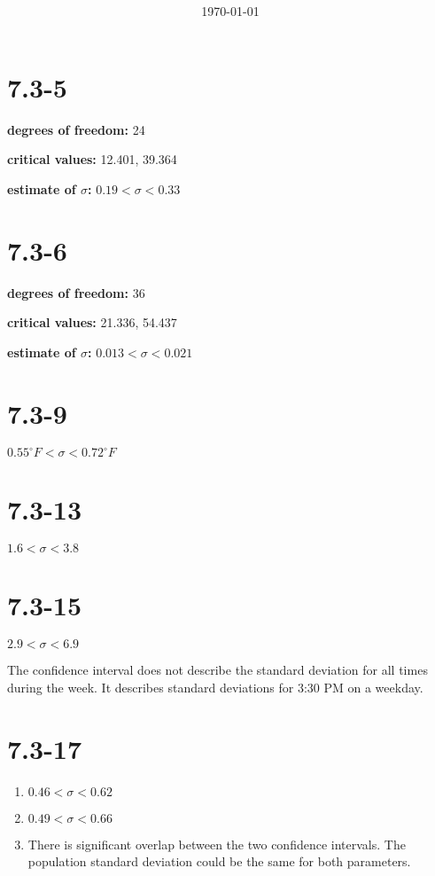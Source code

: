 \documentclass[12pt,fleqn]{article}
\title{\classdescription\ \\ \classname\ \\ $\ $ \\ \assignment}
\author{\authorname}
\date{\today}
\newcommand{\chapter}{7.3}
\newcommand{\problem}[1]{\vspace{5ex}\section*{\chapter-#1}}
\begin{document}
\maketitle


\problem{5}
\textbf{degrees of freedom:} 24

\textbf{critical values:} 12.401, 39.364

\textbf{estimate of $\sigma$:} $0.19 < \sigma < 0.33$


\problem{6}
\textbf{degrees of freedom:} 36

\textbf{critical values:} 21.336, 54.437

\textbf{estimate of $\sigma$:} $0.013 < \sigma < 0.021$


\problem{9}
$0.55^\circ F < \sigma < 0.72^\circ F$


\problem{13}
$1.6 < \sigma < 3.8$


\problem{15}
$2.9 < \sigma < 6.9$

The confidence interval does not describe the standard deviation for all times during the week. It describes standard deviations for 3:30 PM on a weekday.


\problem{17}
\begin{enumerate}[label=\alph*.]
\item $0.46 < \sigma < 0.62$
\item $0.49 < \sigma < 0.66$
\item There is significant overlap between the two confidence intervals. The population standard deviation could be the same for both parameters.
\end{enumerate}
\end{document}
